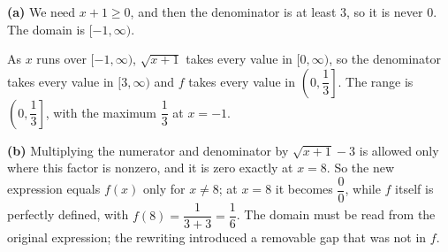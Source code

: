 \textbf{(a)} We need $x+1\ge0$, and then the denominator is at least $3$, so it is never $0$. The domain is $[-1,\infty)$.

As $x$ runs over $[-1,\infty)$, $\sqrt{x+1}$ takes every value in $[0,\infty)$, so the denominator takes every value in $[3,\infty)$ and $f$ takes every value in $\left(0,\dfrac{1}{3}\right]$. The range is $\boxed{\left(0,\dfrac{1}{3}\right]}$, with the maximum $\dfrac{1}{3}$ at $x=-1$.

\textbf{(b)} Multiplying the numerator and denominator by $\sqrt{x+1}-3$ is allowed only where this factor is nonzero, and it is zero exactly at $x=8$. So the new expression equals $f(x)$ only for $x\ne8$; at $x=8$ it becomes $\dfrac{0}{0}$, while $f$ itself is perfectly defined, with $f(8)=\dfrac{1}{3+3}=\dfrac{1}{6}$. The domain must be read from the original expression; the rewriting introduced a removable gap that was not in $f$.
